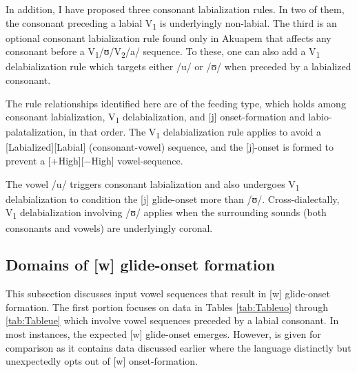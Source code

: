 \documentclass[output=paper,colorlinks,citecolor=brown]{langscibook}
\begin{document}
In addition, I have proposed three consonant labialization rules. In two of them, the consonant preceding a labial V\textsubscript{1} is underlyingly non-labial. The third is an optional consonant labialization rule found only in Akuapem that affects any consonant before a V\textsubscript{1}/ʊ/V\textsubscript{2}/a/ sequence. To these, one can also add a V\textsubscript{1} delabialization rule which targets either /u/ or /ʊ/ when preceded by a labialized consonant. 

The rule relationships identified here are of the  feeding type, which holds among consonant labialization, V\textsubscript{1} delabialization, and [j] onset-formation and labio-palatalization, in that order. The V\textsubscript{1} delabialization rule applies to avoid a [Labialized][Labial] (consonant-vowel) sequence, and the [j]-onset is formed to prevent a [+High][−High] vowel-sequence. 

The vowel /u/ triggers consonant labialization and also undergoes V\textsubscript{1} delabialization to condition the [j] glide-onset more than /ʊ/. Cross-dialectally, V\textsubscript{1} delabialization involving /ʊ/ applies  when the surrounding sounds (both consonants and vowels) are underlyingly coronal.



\subsection{Domains of [w] glide-onset formation} \label{SEC:Wformation}

This subsection discusses input vowel sequences that result in [w] glide-onset formation. The first portion focuses on data in Tables \ref{tab:Tableuo} through \ref{tab:Tableue} which involve vowel sequences preceded by a labial consonant. In most instances, the expected [w] glide-onset emerges. However,  is given for comparison as it contains data discussed earlier where the language distinctly but unexpectedly opts out of [w] onset-formation.
\end{document}
